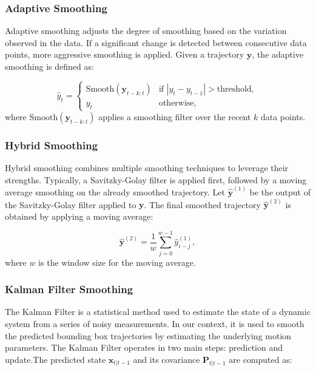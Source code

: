 \documentclass[12pt,oneside]{book} %
\begin{document}
\subsubsection*{Adaptive Smoothing}

\noindent Adaptive smoothing adjusts the degree of smoothing based on the variation
observed in the data. If a significant change is detected between consecutive
data points, more aggressive smoothing is applied. Given a trajectory
$\mathbf{y}$, the adaptive smoothing is defined as:

\begin{equation}
    \hat{y}_t = 
    \begin{cases} 
        \text{Smooth}(\mathbf{y}_{t-k:t}) & \text{if } |y_t - y_{t-1}| > \text{threshold}, \\
        y_t                               & \text{otherwise},
    \end{cases}
\end{equation}
where $\text{Smooth}(\mathbf{y}_{t-k:t})$ applies a smoothing filter over the
recent $k$ data points.

\subsubsection*{Hybrid Smoothing}

\noindent Hybrid smoothing combines multiple smoothing techniques to leverage their
strengths. Typically, a Savitzky-Golay filter is applied first, followed by a
moving average smoothing on the already smoothed trajectory. Let
$\hat{\mathbf{y}}^{(1)}$ be the output of the Savitzky-Golay filter applied to
$\mathbf{y}$. The final smoothed trajectory $\hat{\mathbf{y}}^{(2)}$ is
obtained by applying a moving average:

\begin{equation}
    \hat{\mathbf{y}}^{(2)} = \frac{1}{w} \sum_{j=0}^{w-1} \hat{y}^{(1)}_{i-j},
\end{equation}
where $w$ is the window size for the moving average.

\subsubsection*{Kalman Filter Smoothing}

\noindent The Kalman Filter is a statistical method used to estimate the state of a
dynamic system from a series of noisy measurements. In our context, it is used
to smooth the predicted bounding box trajectories by estimating the underlying
motion parameters. The Kalman Filter operates in two main steps: prediction and
update.The predicted state $\mathbf{x}_{t|t-1}$ and its covariance
$\mathbf{P}_{t|t-1}$ are computed as:
\end{document}
